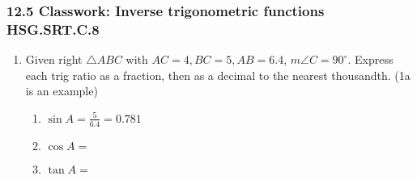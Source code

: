 

\fancyhead[LE]{\thepage}



\subsubsection*{12.5 Classwork: Inverse trigonometric functions \hfill HSG.SRT.C.8}
\begin{enumerate}
\item Given right $\triangle ABC$ with $AC=4, BC=5, AB=6.4$, $m\angle C=90^\circ$. Express each trig ratio as a fraction, then as a decimal to the nearest thousandth. (1a is an example)
  \begin{multicols}{2}
    \begin{enumerate}[itemsep=0.2cm]
      \item $\displaystyle \sin A = \frac{5}{6.4} = 0.781$
      \item $\cos A =$
      \item $\tan A =$
    \end{enumerate}
    \begin{center}
    \end{center}
  \end{multicols} \vspace{1cm}


\end{enumerate}
